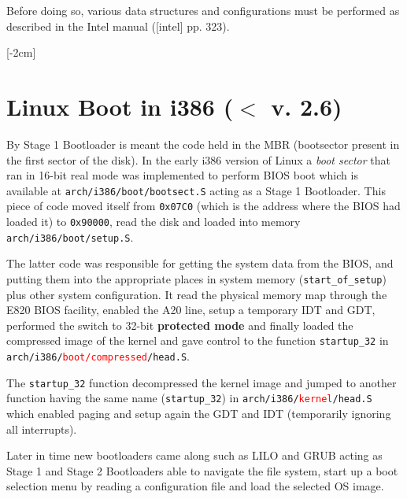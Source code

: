\documentclass[twoside]{article}
\renewcommand{\cite}[1]{[#1]}
\begin{document}
Before doing so, various data structures and configurations must be performed as described in the Intel manual (\cite{intel} pp. 323). 

[-2cm]

\section{Linux Boot in i386 ($<$ v. 2.6)}

By Stage 1 Bootloader is meant the code held in the MBR (bootsector present in the first sector of the disk). In the early i386 version of Linux a \textit{boot sector} that ran in 16-bit real mode was implemented to perform BIOS boot which is available at \texttt{arch/i386/boot/bootsect.S} acting as a Stage 1 Bootloader. This piece of code moved itself from \texttt{0x07C0} (which is the address where the BIOS had loaded it) to \texttt{0x90000}, read the disk and loaded into memory \texttt{arch/i386/boot/setup.S}.

The \marginnote{ (\cite{bovet_cesati_2006} pp. 838, referring to \texttt{setup.S})} latter code was responsible for getting the system data from the BIOS, and putting them into the appropriate places in system memory (\texttt{start_of_setup}) plus other system configuration. It read the physical memory map through the E820 BIOS facility, enabled the A20 line, setup a temporary IDT and GDT, performed the switch to 32-bit \textbf{protected mode} and finally loaded the compressed image of the kernel and gave control to the function \texttt{startup_32} in \texttt{arch/i386/\textcolor{red}{boot/compressed}/head.S}.

The \texttt{startup_32} function decompressed the kernel image and jumped to another function having the same name (\texttt{startup_32}) in \texttt{arch/i386/\textcolor{red}{kernel}/head.S} which enabled paging and setup again the GDT and IDT (temporarily ignoring all interrupts).

Later in time new bootloaders came along such as LILO and GRUB acting as Stage 1 and Stage 2 Bootloaders able to navigate the file system, start up a boot selection menu by reading a configuration file and load the selected OS image.
\end{document}
